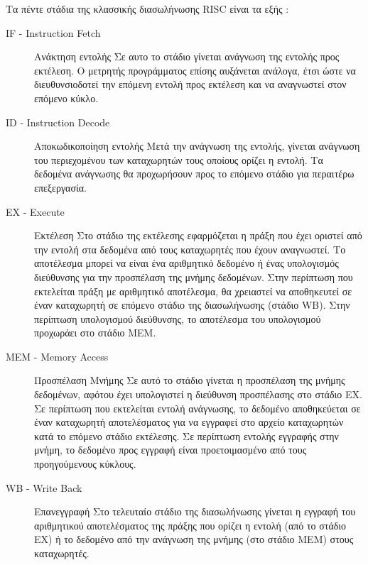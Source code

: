 \documentclass[11pt]{extarticle}
\begin{document}
Τα πέντε στάδια της κλασσικής διασωλήνωσης RISC είναι τα εξής \cite{nikolos}:
\begin{description}
    \item[IF - Instruction Fetch] Ανάκτηση εντολής \newline
    Σε αυτο το στάδιο γίνεται ανάγνωση της εντολής προς εκτέλεση.
    Ο μετρητής προγράμματος επίσης αυξάνεται ανάλογα, έτσι ώστε να διευθυνσιοδοτεί την επόμενη εντολή προς εκτέλεση και να αναγνωστεί στον επόμενο κύκλο.
    \item[ID - Instruction Decode] Αποκωδικοποίηση εντολής \newline
    Μετά την ανάγνωση της εντολής, γίνεται ανάγνωση του περιεχομένου των καταχωρητών τους οποίους ορίζει η εντολή.
    Τα δεδομένα ανάγνωσης θα προχωρήσουν προς το επόμενο στάδιο για περαιτέρω επεξεργασία.
    \item[EX - Execute] Εκτέλεση \newline
    Στο στάδιο της εκτέλεσης εφαρμόζεται η πράξη που έχει οριστεί από την εντολή στα δεδομένα από τους καταχωρητές που έχουν αναγνωστεί.
    Το αποτέλεσμα μπορεί να είναι ένα αριθμητικό δεδομένο ή ένας υπολογισμός διεύθυνσης για την προσπέλαση της μνήμης δεδομένων.
    Στην περίπτωση που εκτελείται πράξη με αριθμητικό αποτέλεσμα, θα χρειαστεί να αποθηκευτεί σε έναν καταχωρητή σε επόμενο στάδιο της διασωλήνωσης (στάδιο WB).
    Στην περίπτωση υπολογισμού διεύθυνσης, το αποτέλεσμα του υπολογισμού προχωράει στο στάδιο MEM.
    \item[MEM - Memory Access] Προσπέλαση Μνήμης \newline
    Σε αυτό το στάδιο γίνεται η προσπέλαση της μνήμης δεδομένων, αφότου έχει υπολογιστεί η διεύθυνση προσπέλασης στο στάδιο EX.
    Σε περίπτωση που εκτελείται εντολή ανάγνωσης, το δεδομένο αποθηκεύεται σε έναν καταχωρητή αποτελέσματος για να εγγραφεί στο αρχείο καταχωρητών κατά το επόμενο στάδιο εκτέλεσης.
    Σε περίπτωση εντολής εγγραφής στην μνήμη, το δεδομένο προς εγγραφή είναι προετοιμασμένο από τους προηγούμενους κύκλους.
    \item[WB - Write Back\footnotemark] Επανεγγραφή \newline
    Στο τελευταίο στάδιο της διασωλήνωσης γίνεται η εγγραφή του αριθμητικού αποτελέσματος της πράξης που ορίζει η εντολή (από το στάδιο ΕΧ) ή το δεδομένο από την ανάγνωση της μνήμης (στο στάδιο MEM) στους καταχωρητές.
\end{description}
\end{document}
